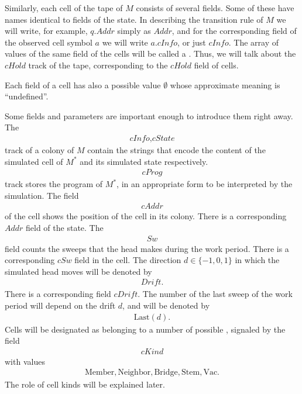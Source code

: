 \documentclass[12pt]{memoir}
\newcommand{\fld}[1]{\ensuremath{\textit{#1}}}
\newcommand{\Addr}{\fld{Addr}}
\newcommand{\cAddr}{\fld{cAddr}}
\newcommand{\Drift}{\fld{Drift}}
\newcommand{\cDrift}{\fld{cDrift}}
\newcommand{\cHold}{\fld{cHold}}
\newcommand{\cInfo}{\fld{cInfo}}
\newcommand{\cKind}{\fld{cKind}}
\newcommand{\cProg}{\fld{cProg}}
\newcommand{\cState}{\fld{cState}}
\newcommand{\Sweep}{\fld{Sw}}
\newcommand{\cSweep}{\fld{cSw}}
\newcommand{\Bridge}{\mathrm{Bridge}}
\newcommand{\Last}{\mathrm{Last}}
\newcommand{\Member}{\mathrm{Member}}
\newcommand{\Neighbor}{\mathrm{Neighbor}}
\newcommand{\Stem}{\mathrm{Stem}}
\newcommand{\Vacant}{\mathrm{Vac}}
\begin{document}
Similarly, each cell of the tape of \( M \) consists of several fields.
Some of these have names identical to fields of the state.
In describing the transition rule of \( M \) we will write, for example,
\( q.\Addr \) simply as \( \Addr \), and for the corresponding field of the
observed cell symbol \( a \) we will write \( a.\cInfo \), or just \( \cInfo \).
The array of values of the same field of the cells will be called a .
Thus, we will talk about the \( \cHold \) track of the tape, corresponding to the
\( \cHold \) field of cells.

Each field of a cell has also a possible value
\( \emptyset \) whose approximate meaning is ``undefined''.

Some fields and parameters are important enough to introduce them right away.
The 
\begin{align*}
   \cInfo,\cState
 \end{align*}
track of a colony of \( M \)
contain the strings that encode the content of the simulated cell of \( M^{*} \) and
its simulated state respectively.
\begin{align*}
 \cProg
 \end{align*}
track stores the program of \( M^{*} \), in an appropriate form 
to be interpreted by the simulation.
The field 
 \begin{align*}
  \cAddr
 \end{align*}
of the cell shows the position of the cell in its colony.
There is a corresponding \( \Addr \) field of the state.
The
 \begin{align*}
 \Sweep
 \end{align*}
field counts the sweeps that the head makes during the work period.
There is a corresponding \( \cSweep \) field in the cell.
The direction \( d\in\{-1,0,1\} \) in which the 
simulated head moves will be denoted by
 \begin{align*}
   \Drift.
 \end{align*}
There is a corresponding field \( \cDrift \).
The number of the last sweep of the work period will depend on the drift \( d \), 
and will be denoted by 
\begin{align}\label{eq:Last}
   \Last(d).
 \end{align}
Cells will be designated as belonging to a number of possible , signaled by the
field 
\begin{align*}
     \cKind
 \end{align*}
with values
       \begin{align*}
          \Member, \Neighbor, \Bridge, \Stem, \Vacant.
       \end{align*}
The role of cell kinds will be explained later.
\end{document}
